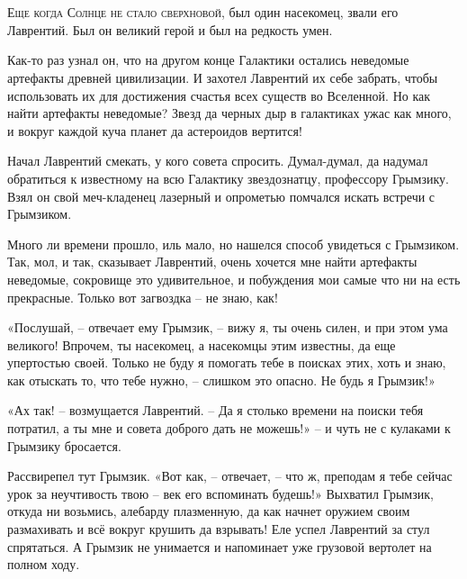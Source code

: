 \documentclass[ebook,oneside,final,openright]{memoir}
\begin{document}
\chapter{}
 \lettrine{Е}{ще когда Солнце не стало сверхновой,} был один насекомец, звали его Лаврентий. Был он великий герой и был на редкость умен.\par
\par
Как-то раз узнал он, что на другом конце Галактики остались неведомые артефакты древней цивилизации. И захотел Лаврентий их себе забрать, чтобы использовать их для достижения счастья всех существ во Вселенной. Но как найти артефакты неведомые? Звезд да черных дыр в галактиках ужас как много, и вокруг каждой куча планет да астероидов вертится!\par
\par
Начал Лаврентий смекать, у кого совета спросить. Думал-думал, да надумал обратиться к известному на всю Галактику звездознатцу, профессору Грымзику. Взял он свой меч-кладенец лазерный и опрометью помчался искать встречи с Грымзиком.\par
\par
Много ли времени прошло, иль мало, но нашелся способ увидеться с Грымзиком. Так, мол, и так, сказывает Лаврентий, очень хочется мне найти артефакты неведомые, сокровище это удивительное, и побуждения мои самые что ни на есть прекрасные. Только вот загвоздка – не знаю, как!\par
\par
«Послушай, – отвечает ему Грымзик, – вижу я, ты очень силен, и при этом ума великого! Впрочем, ты насекомец, а насекомцы этим известны, да еще упертостью своей. Только не буду я помогать тебе в поисках этих, хоть и знаю, как отыскать то, что тебе нужно, – слишком это опасно. Не будь я Грымзик!» \par
\par
«Ах так! – возмущается Лаврентий. – Да я столько времени на поиски тебя потратил, а ты мне и совета доброго дать не можешь!» – и чуть не с кулаками к Грымзику бросается. \par
\par
Рассвирепел тут Грымзик. «Вот как, – отвечает, – что ж, преподам я тебе сейчас урок за неучтивость твою – век его вспоминать будешь!» Выхватил Грымзик, откуда ни возьмись, алебарду плазменную, да как начнет оружием своим размахивать и всё вокруг крушить да взрывать! Еле успел Лаврентий за стул спрятаться. А Грымзик не унимается и напоминает уже грузовой вертолет на полном ходу. \par
\par
\end{document}
